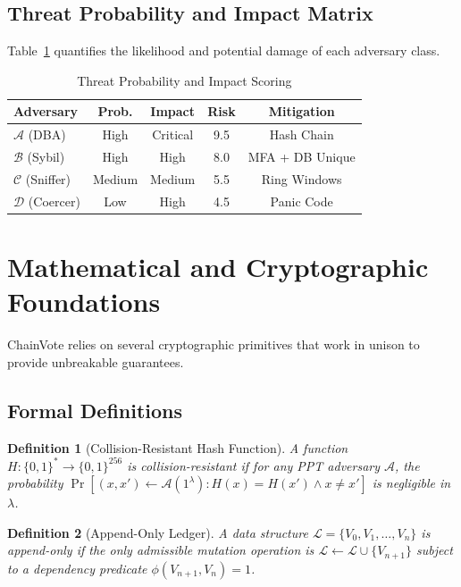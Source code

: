 \documentclass[journal,10pt,twocolumn]{IEEEtran}
\newtheorem{definition}{Definition}
\begin{document}
\subsection{Threat Probability and Impact Matrix}

Table~\ref{tab:threat_matrix} quantifies the likelihood and potential damage of each adversary class.

\begin{table}[htbp]
\caption{Threat Probability and Impact Scoring}
\label{tab:threat_matrix}
\centering
\small
{}
\begin{tabular}{@{}lcccc@{}}
\toprule
\textbf{Adversary} & \textbf{Prob.} & \textbf{Impact} & \textbf{Risk} & \textbf{Mitigation} \\
\midrule
$\mathcal{A}$ (DBA) & High & Critical & \cellcolor{chainred!25}9.5 & Hash Chain \\
$\mathcal{B}$ (Sybil) & High & High & \cellcolor{chainred!15}8.0 & MFA + DB Unique \\
$\mathcal{C}$ (Sniffer) & Medium & Medium & \cellcolor{yellow!30}5.5 & Ring Windows \\
$\mathcal{D}$ (Coercer) & Low & High & \cellcolor{yellow!20}4.5 & Panic Code \\
\bottomrule
\end{tabular}
\end{table}

\section{Mathematical and Cryptographic Foundations}

ChainVote relies on several cryptographic primitives that work in unison to provide unbreakable guarantees.

\subsection{Formal Definitions}

\begin{definition}[Collision-Resistant Hash Function]
A function $H: \{0,1\}^* \rightarrow \{0,1\}^{256}$ is collision-resistant if for any PPT adversary $\mathcal{A}$, the probability $\Pr[(x, x') \leftarrow \mathcal{A}(1^\lambda) : H(x) = H(x') \wedge x \neq x']$ is negligible in $\lambda$.
\end{definition}

\begin{definition}[Append-Only Ledger]
A data structure $\mathcal{L} = \{V_0, V_1, \ldots, V_n\}$ is append-only if the only admissible mutation operation is $\mathcal{L} \leftarrow \mathcal{L} \cup \{V_{n+1}\}$ subject to a dependency predicate $\phi(V_{n+1}, V_n) = 1$.
\end{definition}
\end{document}
